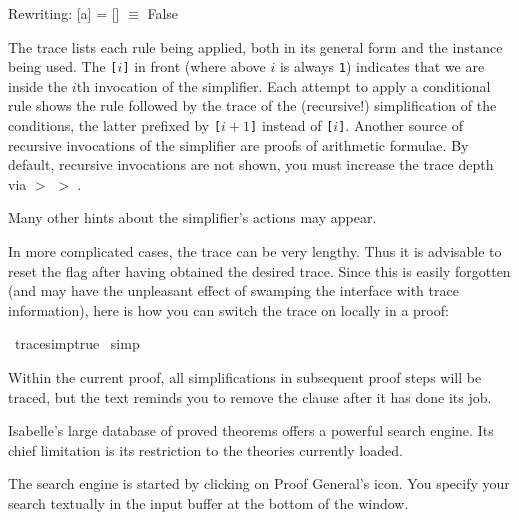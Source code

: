 \begin{isabellebody}
\begin{isamarkuptext}
\begin{ttbox}
[1]Rewriting:
[a] = [] \(\equiv\) False
\end{ttbox}
The trace lists each rule being applied, both in its general form and
the instance being used. The \texttt{[}$i$\texttt{]} in front (where
above $i$ is always \texttt{1}) indicates that we are inside the $i$th
invocation of the simplifier. Each attempt to apply a
conditional rule shows the rule followed by the trace of the
(recursive!) simplification of the conditions, the latter prefixed by
\texttt{[}$i+1$\texttt{]} instead of \texttt{[}$i$\texttt{]}.
Another source of recursive invocations of the simplifier are
proofs of arithmetic formulae. By default, recursive invocations are not shown,
you must increase the trace depth via  $>$  $>$ .

Many other hints about the simplifier's actions may appear.

In more complicated cases, the trace can be very lengthy.  Thus it is
advisable to reset the  flag after having
obtained the desired trace.
Since this is easily forgotten (and may have the unpleasant effect of
swamping the interface with trace information), here is how you can switch
the trace on locally in a proof:%
\end{isamarkuptext}%
\isamarkuptrue%
%
\isadelimproof
%
\endisadelimproof
%
\isatagproof
{}\isamarkupfalse%
\ {\isacharbrackleft}{\isacharbrackleft}trace{\isacharunderscore}simp{\isacharequal}true{\isacharbrackright}{\isacharbrackright}\isanewline
{}\isamarkupfalse%
\ simp%
\endisatagproof
{\isafoldproof}%
%
\isadelimproof
%
\endisadelimproof
%
\begin{isamarkuptext}%
\noindent
Within the current proof, all simplifications in subsequent proof steps
will be traced, but the text reminds you to remove the  clause
after it has done its job.%
\end{isamarkuptext}%
\isamarkuptrue%
%
\isamarkuptrue%
%
\begin{isamarkuptext}%
Isabelle's large database of proved theorems 
offers a powerful search engine. Its chief limitation is
its restriction to the theories currently loaded.

\begin{pgnote}
The search engine is started by clicking on Proof General's  icon.
You specify your search textually in the input buffer at the bottom
of the window.
\end{pgnote}


\end{isamarkuptext}
\end{isabellebody}
